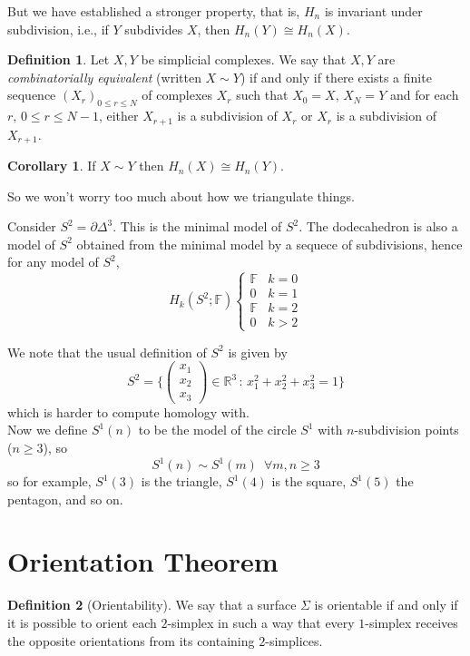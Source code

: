 \documentclass[a4paper,14pt]{extarticle}
\theoremstyle{definition}
\newtheorem*{definition}{Definition}
\newtheorem*{corollary}{Corollary}
\begin{document}
But we have established a stronger property, that is, $H_n$ is invariant under subdivision,
i.e., if $Y$ subdivides $X$, then $H_n(Y)\cong H_n(X)$.

\begin{definition}
	Let $X,Y$ be simplicial complexes. We say that $X,Y$ are \emph{combinatorially equivalent}
	(written $X\sim Y$) if and only if there exists a finite sequence $(X_r)_{0\leq r\leq N}$ of
	complexes $X_r$ such that $X_0=X, \,X_N=Y$ and for each $r, \,0\leq r\leq N-1$, either
	$X_{r+1}$ is a subdivision of $X_r$ or $X_r$ is a subdivision of $X_{r+1}$.
\end{definition}

\begin{corollary}
	If $X\sim Y$ then $H_n(X)\cong H_n(Y)$.
\end{corollary}

\noindent So we won't worry too much about how we triangulate things.

\vspace{12pt}

Consider $S^2=\partial\Delta^3$. This is the minimal model
of $S^2$. The dodecahedron is also a model of $S^2$ obtained from the minimal model
by a sequece of subdivisions, hence for any model of $S^2$,
\[H_k(S^2;\mathbb{F})
	\begin{cases}
		\mathbb{F}&k=0\\0&k=1\\\mathbb{F}&k=2\\0&k>2
	\end{cases}\] 

We note that the usual definition of $S^2$ is given by 
\[S^2=\{\begin{pmatrix}x_1\\x_2\\x_3\end{pmatrix}\in\mathbb{R}^3\,:\,
x_1^2+x_2^2+x_3^2=1\}\] which is harder to compute homology with. \\

Now we define $S^1(n)$ to be the model of the circle $S^1$ with
$n$-subdivision points ($n\geq3$), so \[S^1(n)\sim S^1(m)\,\,\,\forall m,n\geq3\]
so for example, $S^1(3)$ is the triangle, $S^1(4)$ is the square, $S^1(5)$ the pentagon, and so on.

\section{Orientation Theorem}
\begin{definition}[Orientability]
	We say that a surface $\Sigma$ is orientable if and only if it is possible to orient
	each $2$-simplex in such a way that every $1$-simplex receives the opposite orientations
	from its containing $2$-simplices.
\end{definition}
\end{document}
